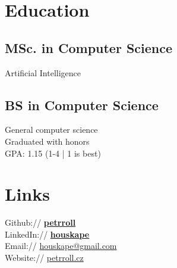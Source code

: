 \documentclass[a4paper]{deedy-resume} %
\begin{document}
\begin{minipage}[t]{0.33\textwidth} %


\section{Education} 

\subsection{MSc. in Computer Science}
Artificial Intelligence \\


\sectionspace %

\subsection{BS in Computer Science}
General computer science \\
Graduated with honors \\
GPA: 1.15 (1-4 | 1 is best) \\

\sectionspace %


\section{Links} 

Github:// \href{https://github.com/petrroll}{\bf petrroll} \\
LinkedIn:// \href{https://www.linkedin.com/in/houskape}{\bf houskape} \\
Email:// \href{mailto:houskape@gmail.com}{houskape@gmail.com} \\
Website:// \href{http://www.petrroll.cz}{petrroll.cz} \\

\sectionspace %


\end{minipage}
\end{document}
